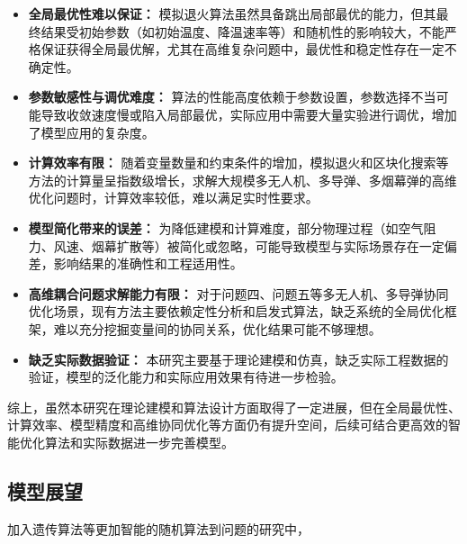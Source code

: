 \documentclass{article}
\begin{document}
\begin{itemize}
    \item \textbf{全局最优性难以保证：} 模拟退火算法虽然具备跳出局部最优的能力，但其最终结果受初始参数（如初始温度、降温速率等）和随机性的影响较大，不能严格保证获得全局最优解，尤其在高维复杂问题中，最优性和稳定性存在一定不确定性。
    \item \textbf{参数敏感性与调优难度：} 算法的性能高度依赖于参数设置，参数选择不当可能导致收敛速度慢或陷入局部最优，实际应用中需要大量实验进行调优，增加了模型应用的复杂度。
    \item \textbf{计算效率有限：} 随着变量数量和约束条件的增加，模拟退火和区块化搜索等方法的计算量呈指数级增长，求解大规模多无人机、多导弹、多烟幕弹的高维优化问题时，计算效率较低，难以满足实时性要求。
    \item \textbf{模型简化带来的误差：} 为降低建模和计算难度，部分物理过程（如空气阻力、风速、烟幕扩散等）被简化或忽略，可能导致模型与实际场景存在一定偏差，影响结果的准确性和工程适用性。
    \item \textbf{高维耦合问题求解能力有限：} 对于问题四、问题五等多无人机、多导弹协同优化场景，现有方法主要依赖定性分析和启发式算法，缺乏系统的全局优化框架，难以充分挖掘变量间的协同关系，优化结果可能不够理想。
    \item \textbf{缺乏实际数据验证：} 本研究主要基于理论建模和仿真，缺乏实际工程数据的验证，模型的泛化能力和实际应用效果有待进一步检验。
\end{itemize}

综上，虽然本研究在理论建模和算法设计方面取得了一定进展，但在全局最优性、计算效率、模型精度和高维协同优化等方面仍有提升空间，后续可结合更高效的智能优化算法和实际数据进一步完善模型。

\subsection{模型展望}
加入遗传算法等更加智能的随机算法到问题的研究中，
\end{document}
